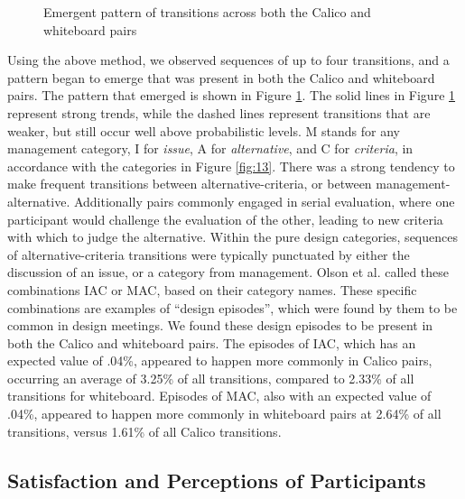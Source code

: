 \begin{figure}
  \centering
\caption{Emergent pattern of transitions across both the Calico and whiteboard pairs}
\label{fig:14}       %
\end{figure}

Using the above method, we observed sequences of up to four transitions, and a pattern began to emerge that was present in both the Calico and whiteboard pairs. The pattern that emerged is shown in Figure \ref{fig:14}. The solid lines in Figure \ref{fig:14} represent strong trends, while the dashed lines represent transitions that are weaker, but still occur well above probabilistic levels. M stands for any management category, I for \emph{issue}, A for \emph{alternative}, and C for \emph{criteria}, in accordance with the categories in Figure \ref{fig:13}. There was a strong tendency to make frequent transitions between alternative-criteria, or between management-alternative. Additionally pairs commonly engaged in serial evaluation, where one participant would challenge the evaluation of the other, leading to new criteria with which to judge the alternative. Within the pure design categories, sequences of alternative-criteria transitions were typically punctuated by either the discussion of an issue, or a category from management. Olson et al. called these combinations IAC or MAC, based on their category names. These specific combinations are examples of ``design episodes'', which were found by them to be common in design meetings. We found these design episodes to be present in both the Calico and whiteboard pairs. The episodes of IAC, which has an expected value of .04\%, appeared to happen more commonly in Calico pairs, occurring an average of 3.25\% of all transitions, compared to 2.33\% of all transitions for whiteboard. Episodes of MAC, also with an expected value of .04\%, appeared to happen more commonly in whiteboard pairs at 2.64\% of all transitions, versus 1.61\% of all Calico transitions. 

\subsection {Satisfaction and Perceptions of Participants}
\label{results:3}

